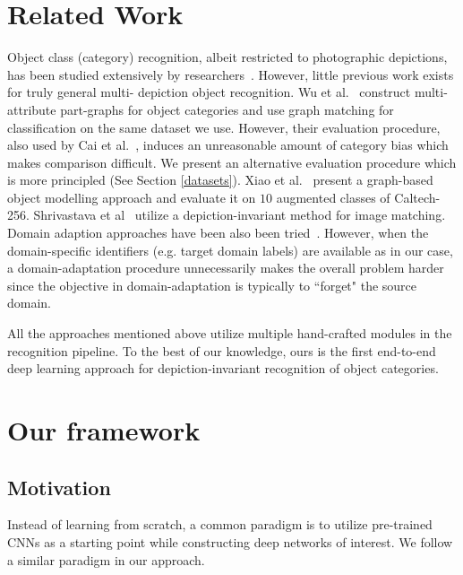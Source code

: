 \documentclass[preprint]{sig-alternate-05-2015}
\begin{document}
\section{Related Work}
\label{sec:relatedwork}

Object class (category) recognition, albeit restricted to photographic depictions, has been studied extensively by researchers~\cite{fergus2003object,fidler2007towards,shotton2008multiscale}.
However, little previous work exists for truly general multi- depiction object recognition. Wu et al.~\cite{wu2014learning} construct  multi-attribute part-graphs for object categories and use graph matching for classification on the same dataset we use. However, their evaluation procedure, also used by Cai et al.~\cite{cai2015cross,cai2015beyond}, induces an unreasonable amount of category bias which makes comparison difficult. We present an alternative evaluation procedure which is more principled (See Section \ref{datasets}). Xiao et al.~\cite{Xiao20111023}
 present a graph-based object modelling approach and evaluate it on $10$ augmented classes of Caltech-256. Shrivastava et al~\cite{shrivastava-sa11} utilize a depiction-invariant method for image matching. Domain adaption approaches have been also been tried~\cite{cai2015beyond}. However, when the domain-specific identifiers (e.g. target domain labels) are available as in our case, a domain-adaptation procedure unnecessarily makes the overall problem harder since the objective in domain-adaptation is typically to ``forget" the source domain. 

All the approaches mentioned above utilize multiple hand-crafted modules in the recognition pipeline. To the best of our knowledge, ours is the first end-to-end deep learning approach for depiction-invariant recognition of object categories.

\section{Our framework}
\label{sec:framework}

\subsection{Motivation}
\label{sec:motivation}

Instead of learning from scratch, a common paradigm is to utilize pre-trained CNNs as a starting point while constructing deep networks of interest. We follow a similar paradigm in our approach. 
\end{document}
